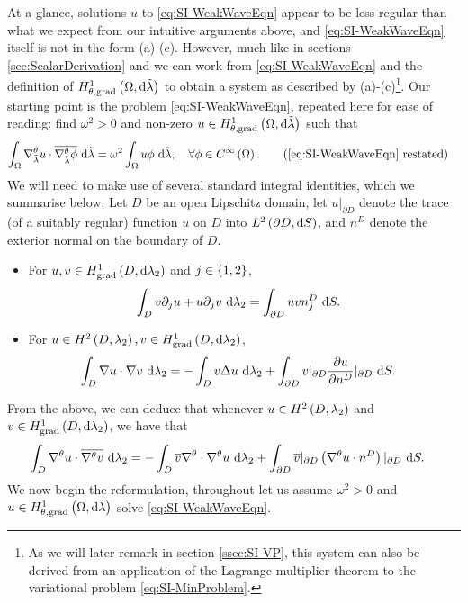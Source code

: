 At a glance, solutions $u$ to \eqref{eq:SI-WeakWaveEqn} appear to be less regular than what we expect from our intuitive arguments above, and \eqref{eq:SI-WeakWaveEqn} itself is not in the form (a)-(c).
However, much like in sections \ref{sec:ScalarDerivation} and  we can work from \eqref{eq:SI-WeakWaveEqn} and the definition of $H^1_{\theta, \mathrm{grad}}\left( \Omega, \mathrm{d}\tilde{\lambda} \right)$ to obtain a system as described by (a)-(c)\footnote{As we will later remark in section \ref{ssec:SI-VP}, this system can also be derived from an application of the Lagrange multiplier theorem to the variational problem \eqref{eq:SI-MinProblem}.}.
Our starting point is the problem \eqref{eq:SI-WeakWaveEqn}, repeated here for ease of reading: find $\omega^2>0$ and non-zero $u\in H^1_{\theta, \mathrm{grad}}\left( \Omega, \mathrm{d}\tilde{\lambda} \right)$ such that
\begin{align*}
	\integral{\ddom}{ \tgrad_{\compMes}u\cdot\overline{\tgrad_{\compMes}\phi} }{\compMes}
	&= \omega^2 \integral{\ddom}{ u\overline{\phi} }{\compMes}, \quad\forall\phi\in\smooth{\ddom}. \tag{\eqref{eq:SI-WeakWaveEqn} restated}
\end{align*}
We will need to make use of several standard integral identities, which we summarise below.
Let $D$ be an open Lipschitz domain, let $u\vert_{\partial D}$ denote the trace (of a suitably regular) function $u$ on $D$ into $L^{2}\left( \partial D,\mathrm{d}S \right)$, and $n^D$ denote the exterior normal on the boundary of $D$.
\begin{itemize}
	\item For $u,v\in H^1_\mathrm{grad}\left( D, \mathrm{d}\lambda_2 \right)$ and $j\in\left\{ 1,2 \right\}$,
	\begin{align*}
		\int_{D} v\partial_j u + u\partial_j v  \ \mathrm{d}\lambda_2
		&= \int_{\partial D} u v n^D_j  \ \mathrm{d}S.
	\end{align*}
	\item For $u\in H^2\left( D,\lambda_2 \right), v\in H^1_\mathrm{grad}\left( D, \mathrm{d}\lambda_2 \right)$,
	\begin{align*}
		\int_{D} \nabla u\cdot \nabla v  \ \mathrm{d}\lambda_2 
		&=  - \int_{D} v\Delta u  \ \mathrm{d}\lambda_2 + \int_{\partial D} v\vert_{\partial D}\dfrac{\partial u}{\partial n^D}\vert_{\partial D}  \ \mathrm{d}S.
	\end{align*}
\end{itemize}
From the above, we can deduce that whenever $u\in H^2\left( D,\lambda_2 \right)$ and $v\in H^1_\mathrm{grad}\left( D, \mathrm{d}\lambda_2 \right)$, we have that
\begin{align*}
	\int_{D} \nabla^{\theta} u\cdot\overline{\nabla^{\theta} v}  \ \mathrm{d}\lambda_2
	&= - \int_{D} \overline{v}\nabla^{\theta}\cdot\nabla^{\theta} u  \ \mathrm{d}\lambda_2 + \int_{\partial D} \overline{v}\vert_{\partial D}\left( \nabla^{\theta} u\cdot n^D \right)\vert_{\partial D}  \ \mathrm{d}S.
\end{align*}
We now begin the reformulation, throughout let us assume $\omega^2>0$ and $u\in H^1_{\theta, \mathrm{grad}}\left( \Omega, \mathrm{d}\tilde{\lambda} \right)$ solve \eqref{eq:SI-WeakWaveEqn}.

